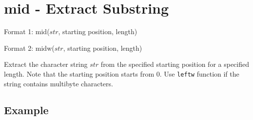 
%

\section{mid - Extract Substring\label{sect:mid}}

Format 1: mid($str$, starting position, length)

Format 2: midw($str$, starting position, length)

Extract the character string $str$ from the specified starting position for a specified length. Note that the starting position starts from 0. Use \verb|leftw| function if the string contains multibyte characters.


\subsection*{Example}


%

